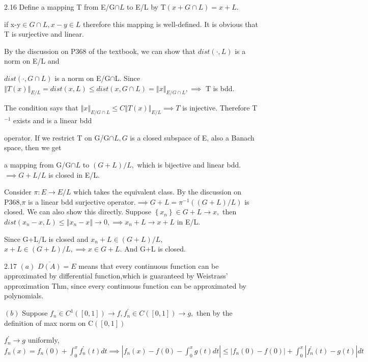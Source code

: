 \documentclass{article}
\begin{document}
2.16 Define a mapping T from E/G$\cap L$ to E/L by T$\left( x+G\cap L\right)
=x+L.$ 

\bigskip if x-y$\in G\cap L,x-y\in L$ therefore this mapping is
well-defined. It is obvious that T is surjective and linear.

By the discussion on P368 of the textbook, we can show that $dist\left(
\cdot ,L\right) $ is a norm on E/L and

$dist\left( \cdot ,G\cap L\right) $ is a norm on E/G$\cap $L. Since $%
\left\Vert T\left( x\right) \right\Vert _{E/L}=dist\left( x,L\right) \leq
dist\left( x,G\cap L\right) =\left\Vert x\right\Vert _{E/G\cap L},\implies $%
T is bdd.

The condition says that $\left\Vert x\right\Vert _{E/G\cap L}\leq
C\left\Vert T\left( x\right) \right\Vert _{E/L}\implies T$ is injective.
Therefore T$^{-1}$ exists and is a linear bdd

operator. If we restrict T on G/G$\cap L,G$ is a closed subspace of E, also
a Banach space, then we get

a mapping from G/G$\cap L$ to $\left( G+L\right) /L,$ which is bijective and
linear bdd. $\implies G+L/L$ is closed in E/L.

Consider $\pi :E\rightarrow E/L$ which takes the equivalent class. By the
discussion on P368,$\pi $ is a linear bdd surjective operator.$\implies
G+L=\pi ^{-1}\left( \left( G+L\right) /L\right) $ is closed. We can also
show this directly. Suppose $\left\{ x_{n}\right\} \in G+L\rightarrow x,$%
then $dist\left( x_{n}-x,L\right) \leq \left\Vert x_{n}-x\right\Vert
\rightarrow 0,\implies x_{n}+L\rightarrow x+L$ in E/L.

Since G+L/L is closed and $x_{n}+L\in \left( G+L\right) /L$, $x+L\in \left(
G+L\right) /L,\implies x\in G+L.$ And G+L is closed.        

2.17 $\left( a\right) $ $\overline{D\left( A\right) }=E$ means that every
continuous function can be approximated by differential function,which is
guaranteed by Weistrass' approximation Thm, since every continuous function
can be approximated by polynomials.

$\left( b\right) $ Suppose $f_{n}\in C^{1}\left( \left[ 0,1\right] \right)
\rightarrow f,f_{n}^{\prime }\in C\left( \left[ 0,1\right] \right)
\rightarrow g,$ then by the definition of max norm on C$\left( \left[ 0,1%
\right] \right) $

$f_{n}^{\prime }\rightarrow g$ uniformly,  $f_{n}\left( x\right)
=f_{n}\left( 0\right) +\int_{0}^{x}f_{n}^{\prime }\left( t\right) dt\implies
\left\vert f_{n}\left( x\right) -f\left( 0\right) -\int_{0}^{x}g\left(
t\right) dt\right\vert \leq \left\vert f_{n}\left( 0\right) -f\left(
0\right) \right\vert +\int_{0}^{x}\left\vert f_{n}^{\prime }\left( t\right)
-g\left( t\right) \right\vert dt$
\end{document}
